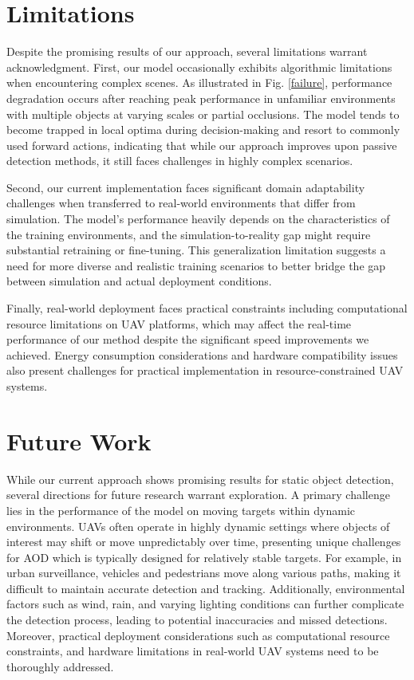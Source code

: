 \documentclass[lettersize,journal]{IEEEtran}
\begin{document}
\section{Limitations}
Despite the promising results of our approach, several limitations warrant acknowledgment. First, our model occasionally exhibits algorithmic limitations when encountering complex scenes. As illustrated in Fig. \ref{failure}, performance degradation occurs after reaching peak performance in unfamiliar environments with multiple objects at varying scales or partial occlusions. The model tends to become trapped in local optima during decision-making and resort to commonly used forward actions, indicating that while our approach improves upon passive detection methods, it still faces challenges in highly complex scenarios.

Second, our current implementation faces significant domain adaptability challenges when transferred to real-world environments that differ from simulation. The model's performance heavily depends on the characteristics of the training environments, and the simulation-to-reality gap might require substantial retraining or fine-tuning. This generalization limitation suggests a need for more diverse and realistic training scenarios to better bridge the gap between simulation and actual deployment conditions.

Finally, real-world deployment faces practical constraints including computational resource limitations on UAV platforms, which may affect the real-time performance of our method despite the significant speed improvements we achieved. Energy consumption considerations and hardware compatibility issues also present challenges for practical implementation in resource-constrained UAV systems.

\section{Future Work}
While our current approach shows promising results for static object detection, several directions for future research warrant exploration. A primary challenge lies in the performance of the model on moving targets within dynamic environments. UAVs often operate in highly dynamic settings where objects of interest may shift or move unpredictably over time, presenting unique challenges for AOD which is typically designed for relatively stable targets. For example, in urban surveillance, vehicles and pedestrians move along various paths, making it difficult to maintain accurate detection and tracking. Additionally, environmental factors such as wind, rain, and varying lighting conditions can further complicate the detection process, leading to potential inaccuracies and missed detections. Moreover, practical deployment considerations such as computational resource constraints, and hardware limitations in real-world UAV systems need to be thoroughly addressed.
\end{document}
